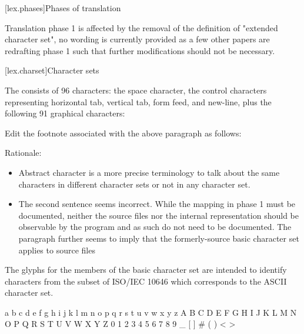 \documentclass{wg21}
\begin{document}
[lex.phases]{Phases of translation}%

\begin{quoteblock}
Translation phase 1 is affected by the removal of the definition of "extended character set", no wording is currently provided
as a few other papers are redrafting phase 1 such that further modifications should not be necessary.
\end{quoteblock}

[lex.charset]{Character sets}



\pnum
{}%
The  consists of 96 characters: the space character,
the control characters representing horizontal tab, vertical tab, form feed, and
new-line, plus the following 91 graphical characters:

\begin{quoteblock}
Edit the footnote associated with the above paragraph as follows:

Rationale:
\begin{itemize}
\item Abstract character is a more precise terminology to talk about the same characters in different character sets or not in any character set.
\item The second sentence seems incorrect. While the mapping in phase 1 must be documented, neither the source files nor the internal representation should be observable by the program and as such do not need to be documented. The paragraph further seems to imply that the formerly-source basic character set applies to source files
\end{itemize}

\begin{quoteblock}
The glyphs for
the members of the basic  character set are intended to
identify  characters from the subset of ISO/IEC 10646 which corresponds to the ASCII
character set. 
\end{quoteblock}
\end{quoteblock}

\begin{codeblock}
    a b c d e f g h i j k l m n o p q r s t u v w x y z
    A B C D E F G H I J K L M N O P Q R S T U V W X Y Z
    0 1 2 3 4 5 6 7 8 9
    _ { } [ ] # ( ) < > %
\end{codeblock}
\end{document}
